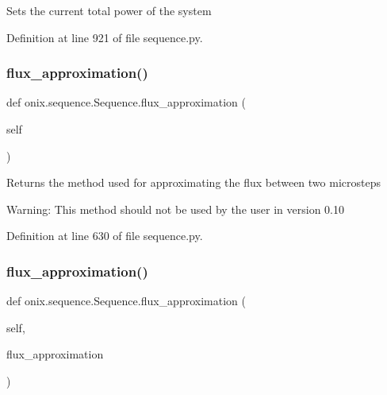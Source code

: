 \begin{DoxyVerb}Sets the current total power of the system
\end{DoxyVerb}
 

Definition at line 921 of file sequence.\+py.

\mbox{\label{classonix_1_1sequence_1_1Sequence_a540435e404fb702638ef020d1f5d79eb}} 
\subsubsection{\texorpdfstring{flux\+\_\+approximation()}{flux\_approximation()}\hspace{0.1cm}{\footnotesize\ttfamily [1/2]}}
{\footnotesize\ttfamily def onix.\+sequence.\+Sequence.\+flux\+\_\+approximation (\begin{DoxyParamCaption}\item[{}]{self }\end{DoxyParamCaption})}

\begin{DoxyVerb}Returns the method used for approximating the flux between two microsteps

Warning: This method should not be used by the user in version 0.10\end{DoxyVerb}
 

Definition at line 630 of file sequence.\+py.

\mbox{\label{classonix_1_1sequence_1_1Sequence_a0705ea21972d5d28041c449f678b93ae}} 
\subsubsection{\texorpdfstring{flux\+\_\+approximation()}{flux\_approximation()}\hspace{0.1cm}{\footnotesize\ttfamily [2/2]}}
{\footnotesize\ttfamily def onix.\+sequence.\+Sequence.\+flux\+\_\+approximation (\begin{DoxyParamCaption}\item[{}]{self,  }\item[{}]{flux\+\_\+approximation }\end{DoxyParamCaption})}

